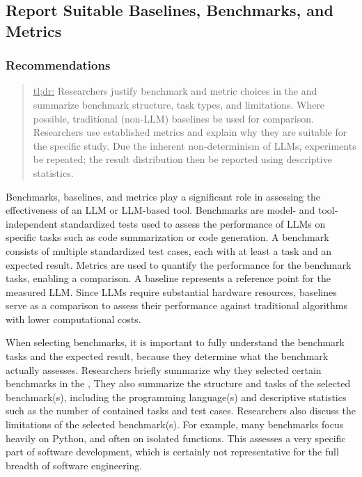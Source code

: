 



\subsection{Report Suitable Baselines, Benchmarks, and Metrics}

\subsubsection{Recommendations}

\begin{quote}
\underline{tl;dr:} Researchers \must justify benchmark and metric choices in the \paper and \should summarize benchmark structure, task types, and limitations. Where possible, traditional (non-LLM) baselines \should be used for comparison. Researchers \should use established metrics and \must explain why they are suitable for the specific study. Due the inherent non-determinism of LLMs, experiments \should be repeated; the result distribution \should then be reported using descriptive statistics.
\end{quote}

Benchmarks, baselines, and metrics play a significant role in assessing the effectiveness of an LLM or LLM-based tool.
Benchmarks are model- and tool-independent standardized tests used to assess the performance of LLMs on specific tasks such as code summarization or code generation.
A benchmark consists of multiple standardized test cases, each with at least a task and an expected result.
Metrics are used to quantify the performance for the benchmark tasks, enabling a comparison.
A baseline represents a reference point for the measured LLM.
Since LLMs require substantial hardware resources, baselines serve as a comparison to assess their performance against traditional algorithms with lower computational costs.

When selecting benchmarks, it is important to fully understand the benchmark tasks and the expected result, because they determine what the benchmark actually assesses.
Researchers \must briefly summarize why they selected certain benchmarks in the \paper, 
They \should also summarize the structure and tasks of the selected benchmark(s), including the programming language(s) and descriptive statistics such as the number of contained tasks and test cases.
Researchers \should also discuss the limitations of the selected benchmark(s).
For example, many benchmarks focus heavily on Python, and often on isolated functions.
This assesses a very specific part of software development, which is certainly not representative for the full breadth of software engineering.

